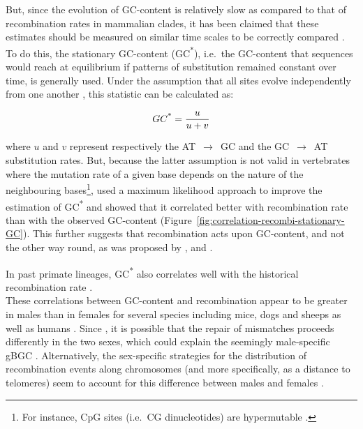 But, since the evolution of GC-content is relatively slow as compared to that of recombination rates in mammalian clades, it has been claimed that these estimates should be measured on similar time scales to be correctly compared \citep{duret2009biased}.
To do this, the stationary GC-content (GC\textsuperscript{*}), i.e.\ the GC-content that sequences would reach at equilibrium if patterns of substitution remained constant over time, is generally used.
Under the assumption that all sites evolve independently from one another \citep{sueoka1962genetic}, this statistic can be calculated as:

\begin{equation*}
	GC\textsuperscript{*} = \frac{u}{u+v}
\end{equation*}

where $u$ and $v$ represent respectively the AT~$\rightarrow$~GC and the GC~$\rightarrow$~AT substitution rates.
But, because the latter assumption is not valid in vertebrates where the mutation rate of a given base depends on the nature of the neighbouring bases\footnote{For instance, CpG sites (i.e.\ CG dinucleotides) are hypermutable \citep{arndt2003distinct}.}, \citet{duret2008impact} used a maximum likelihood approach to improve the estimation of GC\textsuperscript{*} and showed that it correlated better with recombination rate than with the observed GC-content (Figure~\ref{fig:correlation-recombi-stationary-GC}). This further suggests that recombination acts upon GC-content, and not the other way round, as was proposed by \citet{gerton2000global}, \citet{blat2002physical} and \citet{petes2002context}.

In past primate lineages, GC\textsuperscript{*} also correlates well with the historical recombination rate \citep{munch2014finescale}.\\



These correlations between GC-content and recombination appear to be greater in males than in females for several species including mice, dogs and sheeps \citep{popa2012sexspecific} as well as humans \citep{webster2005maledriven, dreszer2007biased, duret2008impact}.
Since  \citep{coop2007evolutionary}, it is possible that the repair of mismatches proceeds differently in the two sexes, which could explain the seemingly male-specific gBGC \citep{duret2009biased}.
Alternatively, the sex-specific strategies for the distribution of recombination events along chromosomes (and more specifically, as a distance to telomeres) seem to account for this difference between males and females \citep{popa2012sexspecific}.



